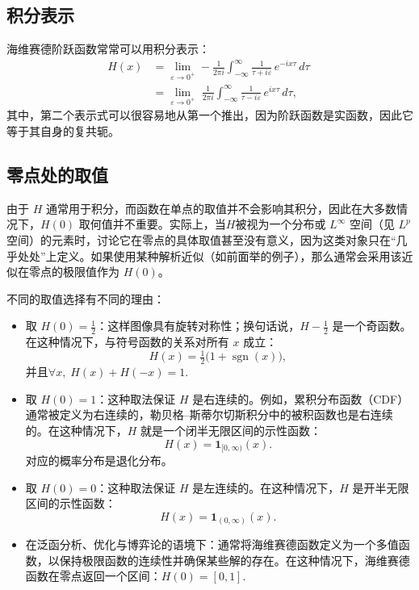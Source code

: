 \subsection{积分表示}
海维赛德阶跃函数常常可以用积分表示：
$$
\begin{aligned}
H(x) &= \lim_{\varepsilon \to 0^{+}} -\frac{1}{2\pi i} \int_{-\infty}^{\infty} \frac{1}{\tau + i\varepsilon}\, e^{-ix\tau}\, d\tau \\[8pt]
&= \lim_{\varepsilon \to 0^{+}} \;\frac{1}{2\pi i} \int_{-\infty}^{\infty} \frac{1}{\tau - i\varepsilon}\, e^{ix\tau}\, d\tau ,
\end{aligned}~
$$
其中，第二个表示式可以很容易地从第一个推出，因为阶跃函数是实函数，因此它等于其自身的复共轭。
\subsection{零点处的取值}
由于 $H$ 通常用于积分，而函数在单点的取值并不会影响其积分，因此在大多数情况下，$H(0)$ 取何值并不重要。实际上，当$H$被视为一个分布或 $L^{\infty}$ 空间（见 $L^p$ 空间）的元素时，讨论它在零点的具体取值甚至没有意义，因为这类对象只在“几乎处处”上定义。如果使用某种解析近似（如前面举的例子），那么通常会采用该近似在零点的极限值作为 $H(0)$。

不同的取值选择有不同的理由：
\begin{itemize}
\item 取 $H(0) = \tfrac{1}{2}$：这样图像具有旋转对称性；换句话说，$H - \tfrac{1}{2}$ 是一个奇函数。在这种情况下，与符号函数的关系对所有 $x$ 成立：
  $$
  H(x) = \tfrac{1}{2}\bigl(1 + \operatorname{sgn}(x)\bigr),~
  $$
  并且$\forall x,\; H(x) + H(-x) = 1$.
\item 取 $H(0) = 1$：这种取法保证 $H$ 是右连续的。例如，累积分布函数（CDF）通常被定义为右连续的，勒贝格–斯蒂尔切斯积分中的被积函数也是右连续的。在这种情况下，$H$ 就是一个闭半无限区间的示性函数：
  $$
  H(x) = \mathbf{1}_{[0,\infty)}(x).~
  $$
  对应的概率分布是退化分布。
\item 取 $H(0) = 0$：这种取法保证 $H$ 是左连续的。在这种情况下，$H$ 是开半无限区间的示性函数：
  $$
  H(x) = \mathbf{1}_{(0,\infty)}(x).~
  $$
\item 在泛函分析、优化与博弈论的语境下：通常将海维赛德函数定义为一个多值函数，以保持极限函数的连续性并确保某些解的存在。在这种情况下，海维赛德函数在零点返回一个区间：$H(0) = [0,1]$.
\end{itemize}


